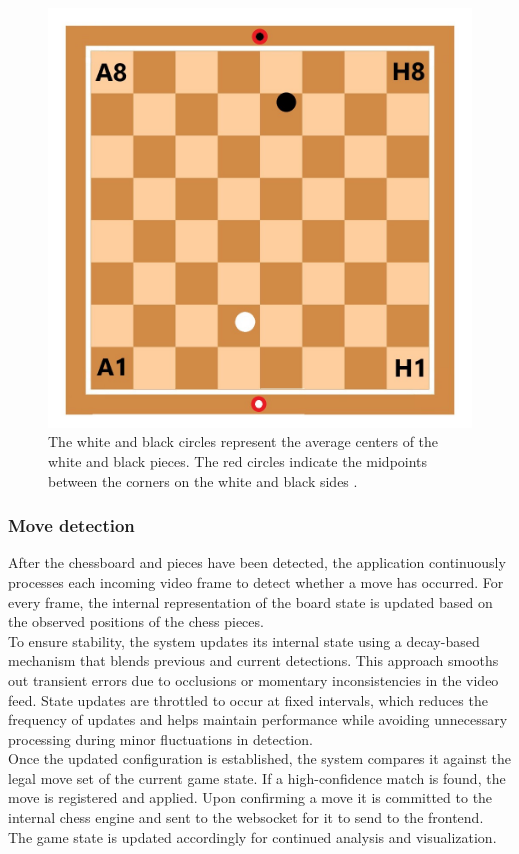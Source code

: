 \begin{figure}[h!]
\centering
\includegraphics[width=0.70\linewidth]{figures/methods/ml-models/label_assignment_board.jpg}
\caption[Assigning labels to chessboard]{The white and black circles represent the average centers of the white and black pieces. The red circles indicate the midpoints between the corners on the white and black sides \cite{vectorstock:chessboard-svg}.}
\label{fig:board_label_assignment}
\end{figure}



\subsubsection*{Move detection}

After the chessboard and pieces have been detected, the application continuously processes each incoming video frame to detect whether a move has occurred. For every frame, the internal representation of the board state is updated based on the observed positions of the chess pieces. \\

To ensure stability, the system updates its internal state using a decay-based mechanism that blends previous and current detections. This approach smooths out transient errors due to occlusions or momentary inconsistencies in the video feed. State updates are throttled to occur at fixed intervals, which reduces the frequency of updates and helps maintain performance while avoiding unnecessary processing during minor fluctuations in detection. \\

Once the updated configuration is established, the system compares it against the legal move set of the current game state. If a high-confidence match is found, the move is registered and applied. Upon confirming a move it is committed to the internal chess engine and sent to the websocket for it to send to the frontend. The game state is updated accordingly for continued analysis and visualization.\\

